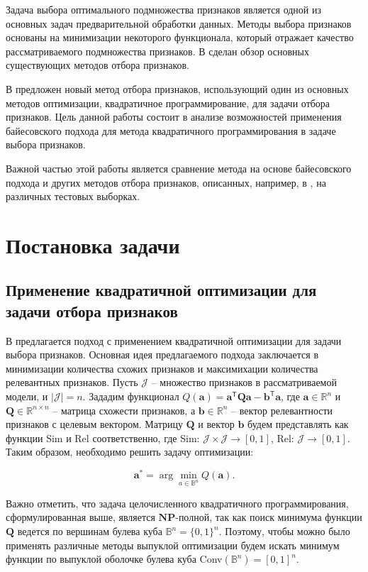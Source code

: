 \documentclass[12pt, twoside]{article}
\newcommand{\ba}{\mathbf{a}}
\newcommand{\bb}{\mathbf{b}}
\newcommand{\bB}{\mathbb{B}}
\newcommand{\bJ}{\mathcal{J}}
\newcommand{\bQ}{\mathbf{Q}}
\newcommand{\getT}{^{\mathsf{T}}}
\begin{document}
Задача выбора оптимального подмножества признаков является одной из основных задач предварительной обработки данных. Методы выбора признаков
основаны на минимизации некоторого функционала, который отражает качество
рассматриваемого подмножества признаков. В \cite{FeatureSelection1, FeatureSelection2} сделан обзор основных существующих методов отбора признаков.

В \cite{KatrutsaS17} предложен новый метод отбора признаков, использующий один из основных методов оптимизации, квадратичное программирование, для задачи отбора признаков. Цель данной работы состоит в анализе возможностей применения байесовского подхода для метода квадратичного программирования в задаче выбора признаков. 

Важной частью этой работы является сравнение метода на основе байесовского подхода и других методов отбора признаков, описанных, например, в \cite{Katrutsa15}, на различных тестовых выборках.


\section{Постановка задачи}

\subsection{Применение квадратичной оптимизации для задачи отбора признаков}

В \cite{KatrutsaS17} предлагается подход с применением квадратичной оптимизации для задачи выбора признаков. Основная идея предлагаемого подхода заключается в минимизации количества схожих признаков и максимихации количества релевантных признаков.
Пусть $\bJ$ -- множество признаков в рассматриваемой модели, и $|\bJ| = n$. 
Зададим функционал $Q(\ba) = \ba \getT \bQ \ba - \bb \getT \ba$, где $\ba \in \mathbb{R}^n$ и $\bQ \in \mathbb{R}^{n \times n}$ -- матрица схожести признаков, а $\bb \in \mathbb{R}^n$ -- вектор релевантности признаков с целевым вектором.
Матрицу $\bQ$ и вектор $\bb$ будем представлять как функции Sim и Rel соответственно, где Sim: $\bJ \times \bJ \rightarrow [0, 1]$, Rel: $\bJ \rightarrow [0, 1]$. Таким образом, необходимо решить задачу оптимизации: 

$$ \ba^* = \arg \min_{a \in \bB^n} Q(\ba).$$

Важно отметить, что задача целочисленного квадратичного программирования, сформулированная выше, является $\mathbf{NP}$-полной, так как поиск минимума функции $\bQ$ ведется по вершинам булева куба $\bB^n = \{0, 1\}^n$. Поэтому, чтобы можно было применять различные методы выпуклой оптимизации будем искать минимум функции по выпуклой оболочке булева куба Conv$(\bB^n) = [0, 1]^n$. 
\end{document}
